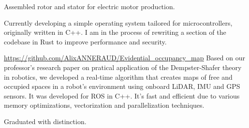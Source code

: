 \documentclass[10pt,a4paper,ragged2e,withhyper]{./AltaCV/altacv}
\begin{document}
\begin{paracol}{2}
  Assembled rotor and stator for electric motor production.

  \smallskip


  Currently developing a simple operating system tailored for microcontrollers, originally written in C++.
  I am in the process of rewriting a section of the codebase in Rust to improve performance and security.

  \divider

  {\url{https://github.com/AlixANNERAUD/Evidential_occupancy_map}}
  {}
  {}
  Based on our professor’s research paper on pratical application of the Dempster-Shafer theory in robotics, we developed a real-time algorithm that creates maps of free and occupied spaces in a robot’s environment using onboard LiDAR, IMU and GPS sensors.
  It was developed for ROS in C++.
  It's fast and efficient due to various memory optimizations, vectorization and parallelization techniques. 

  \medskip

  \switchcolumn



  \divider

  Graduated with distinction.

  \divider


  \smallskip



  \divider


  \divider




\end{paracol}
\end{document}
